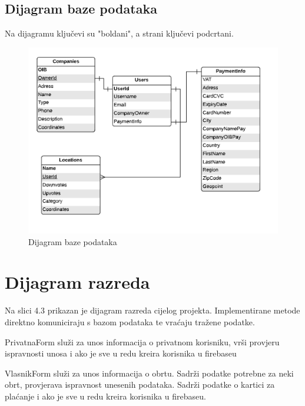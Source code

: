 						  
						  
						  
					  
					  \subsection{Dijagram baze podataka}
						  Na dijagramu ključevi su "boldani", a strani ključevi podcrtani.
						  \begin{figure}[H]
					  \includegraphics[scale=0.9]{slike/Baza.png}
					  \centering
					  \caption{Dijagram baze podataka}
					  \label{fig:promjene}
							\end{figure}
					  
			
		\section{Dijagram razreda}
		
			
			
			Na slici 4.3 prikazan je dijagram razreda cijelog projekta. Implementirane metode direktno komuniciraju s bazom podataka te vraćaju tražene podatke.
			
			PrivatnaForm služi za unos informacija o privatnom korisniku, vrši provjeru ispravnosti unosa i ako je sve u redu kreira korisnika u firebaseu
			
			VlasnikForm služi za unos informacija o obrtu. Sadrži podatke potrebne za neki obrt, provjerava ispravnost unesenih podataka. Sadrži podatke o kartici  za plaćanje  i ako je sve u redu kreira korisnika u firebaseu.
	
